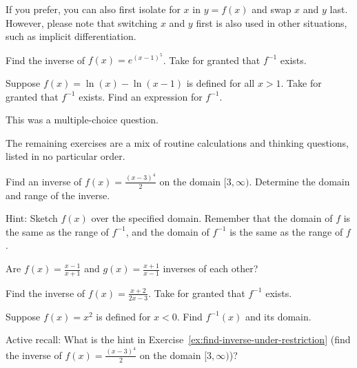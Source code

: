 \documentclass[../main.tex]{subfiles}
\begin{document}
\begin{figure}[H]
  
\end{figure}

If you prefer, you can also first isolate for \(x\) in \(y = f(x)\) and swap \(x\) and \(y\) last. However, please note that switching \(x\) and \(y\) first is also used in other situations, such as implicit differentiation.

\begin{example} \label{eg:find-inverse}
  Find the inverse of \(f(x) = e^{(x-1)^{5}}\). Take for granted that \(f^{-1}\) exists.

\end{example}

\begin{exercise}
  Suppose \(f(x) = \ln(x) - \ln(x - 1)\) is defined for all \(x > 1\). Take for granted that \(f^{-1}\) exists. Find an expression for \(f^{-1}\).

  {\footnotesize This was a multiple-choice question.}

  \blanks*
\end{exercise}
\clearpage

The remaining exercises are a mix of routine calculations and thinking questions, listed in no particular order.

\begin{exercise} \label{ex:find-inverse-under-restriction}
  Find an inverse of \(f(x) = \frac{(x-3)^{4}}{2}\) on the domain \([3,\infty)\).  Determine the domain and range of the inverse.

  {\footnotesize Hint: Sketch \(f(x)\) over the specified domain. Remember that the domain of \(f\) is the same as the range of \(f^{-1}\), and the domain of \(f^{-1}\) is the same as the range of \(f\).}

  \blanks*
\end{exercise}

\begin{exercise} \label{ex:inverse-vs-reciprocal}
  Are \(f(x) = \frac{x-1}{x+1}\) and \(g(x) = \frac{x+1}{x-1}\) inverses of each other?

  \blanks*
\end{exercise}
\clearpage

\begin{exercise}
  Find the inverse of \(f(x) = \frac{x+2}{2x - 3}\). Take for granted that \(f^{-1}\) exists.

  \blanks*
\end{exercise}

\begin{exercise}
  Suppose \(f(x) = x^{2}\) is defined for \(x < 0\). Find \(f^{-1}(x)\) and its domain.

  {\footnotesize Active recall: What is the hint in Exercise~\ref{ex:find-inverse-under-restriction} (find the inverse of \(f(x)=\tfrac{(x-3)^{4}}{2}\) on the domain \([3,\infty)\))?}

  \blanks*
\end{exercise}
\clearpage
\end{document}
